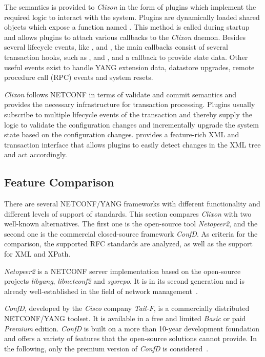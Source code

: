 The semantics is provided to \textit{Clixon} in the form of plugins which implement the required logic to interact with the system. Plugins are dynamically loaded shared objects which expose a function named . This method is called during startup and allows plugins to attach various callbacks to the \textit{Clixon} daemon. Besides several lifecycle events, like ,  and , the main callbacks consist of several transaction hooks, such as ,  and , and a callback to provide state data. Other useful events exist to handle YANG extension data, datastore upgrades, remote procedure call (RPC) events and system resets.

\textit{Clixon} follows NETCONF in terms of validate and commit semantics and provides the necessary infrastructure for transaction processing. Plugins usually subscribe to multiple lifecycle events of the transaction and thereby supply the logic to validate the configuration changes and incrementally upgrade the system state based on the configuration changes.  provides a feature-rich XML and transaction interface that allows plugins to easily detect changes in the XML tree and act accordingly.


\subsection{Feature Comparison}

There are several NETCONF/YANG frameworks with different functionality and different levels of support of standards. This section compares \textit{Clixon} with two well-known alternatives. The first one is the open-source tool \textit{Netopeer2}, and the second one is the commercial closed-source framework \textit{ConfD}. As criteria for the comparison, the supported RFC standards are analyzed, as well as the support for XML and XPath.

\textit{Netopeer2} is a NETCONF server implementation based on the open-source projects \textit{libyang}, \textit{libnetconf2} and \textit{sysrepo}. It is in its second generation and is already well-established in the field of network management~\cite{netopeer2}.

\textit{ConfD}, developed by the \textit{Cisco} company \textit{Tail-F}, is a commercially distributed NETCONF/YANG toolset. It is available in a free and limited \textit{Basic} or paid \textit{Premium} edition. \textit{ConfD} is built on a more than 10-year development foundation and offers a variety of features that the open-source solutions cannot provide. In the following, only the premium version of \textit{ConfD} is considered~\cite{confd}.

